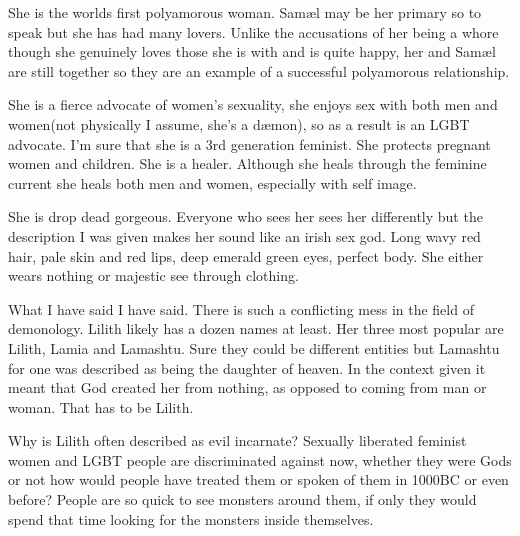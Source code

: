 She is the worlds first polyamorous woman. Sam\ae l may be her primary so to speak but she has had many lovers. Unlike the accusations of her being a whore though she genuinely loves those she is with and is quite happy, her and Sam\ae l are still together so they are an example of a successful polyamorous relationship.

She is a fierce advocate of women's sexuality, she enjoys sex with both men and women(not physically I assume, she's a d\ae mon), so as a result is an LGBT advocate. I'm sure that she is a 3rd generation feminist. She protects pregnant women and children. She is a healer. Although she heals through the feminine current she heals both men and women, especially with self image.

She is drop dead gorgeous. Everyone who sees her sees her differently but the description I was given makes her sound like an irish sex god. Long wavy red hair, pale skin and red lips, deep emerald green eyes, perfect body. She either wears nothing or majestic see through clothing.

What I have said I have said. There is such a conflicting mess in the field of demonology. Lilith likely has a dozen names at least. Her three most popular are Lilith, Lamia and Lamashtu. Sure they could be different entities but Lamashtu for one was described as being the daughter of heaven. In the context given it meant that God created her from nothing, as opposed to coming from man or woman. That has to be Lilith. 

Why is Lilith often described as evil incarnate? Sexually liberated feminist women and LGBT people are discriminated against now, whether they were Gods or not how would people have treated them or spoken of them in 1000BC or even before? People are so quick to see monsters around them, if only they would spend that time looking for the monsters inside themselves.